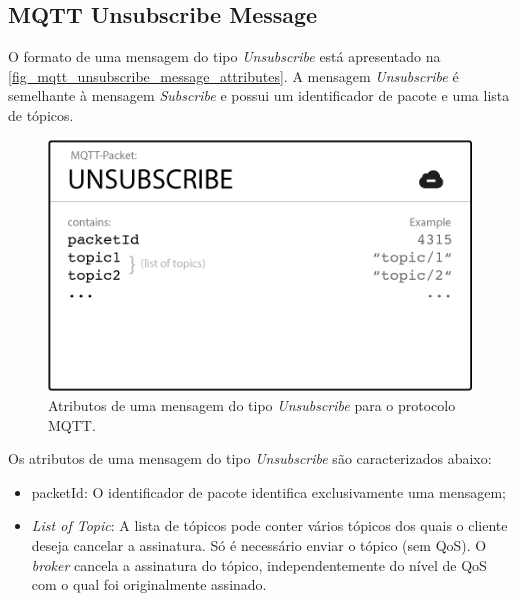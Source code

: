 \documentclass[
    12pt,
    openright,
    twoside,
    a4paper,
    english,
    spanish,
    brazil,
    ]{abntex2}
\begin{document}
\subsection{MQTT Unsubscribe Message}\label{section_mqtt_unsubscribe_message}
O formato de uma mensagem do tipo \textit{Unsubscribe} está apresentado na \autoref{fig_mqtt_unsubscribe_message_attributes}. A mensagem  \textit{Unsubscribe} é semelhante à mensagem  \textit{Subscribe} e possui um identificador de pacote e uma lista de tópicos.
\begin{figure}[htb]
	\begin{center}
		\caption{Atributos de uma mensagem do tipo \textit{Unsubscribe} para o protocolo MQTT.}\label{fig_mqtt_unsubscribe_message_attributes}
		\includegraphics[scale=0.5]{Images/mqtt_unsubscribe_message_attributes.png}
	\end{center}
\end{figure}

Os atributos de uma mensagem do tipo \textit{Unsubscribe} são caracterizados abaixo:
\begin{itemize}
	\item packetId: O identificador de pacote identifica exclusivamente uma mensagem;
	\item \textit{List of Topic}: A lista de tópicos pode conter vários tópicos dos quais o cliente deseja cancelar a assinatura. Só é necessário enviar o tópico (sem QoS). O \textit{broker} cancela a assinatura do tópico, independentemente do nível de QoS com o qual foi originalmente assinado.
\end{itemize}

\end{document}
